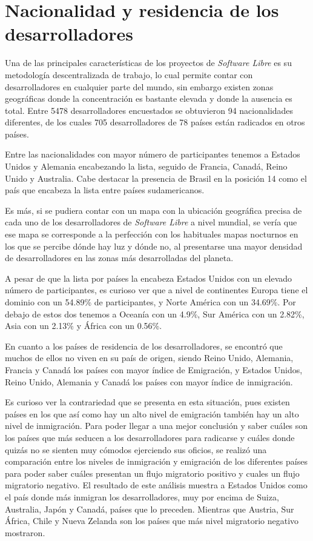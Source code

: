 \section{Nacionalidad y residencia de los desarrolladores}

Una de las principales características de los proyectos de \textit{Software Libre} es su metodología descentralizada de trabajo, lo cual permite contar con desarrolladores en cualquier parte del mundo, sin embargo existen zonas geográficas donde la concentración es bastante elevada y donde la ausencia es total. Entre 5478 desarrolladores encuestados se obtuvieron 94 nacionalidades diferentes, de los cuales 705 desarrolladores de 78 países están radicados en otros países. 

Entre las nacionalidades con mayor número de participantes tenemos a Estados Unidos y Alemania encabezando la lista, seguido de Francia, Canadá, Reino Unido y Australia. Cabe destacar la presencia de Brasil en la posición 14 como el país que encabeza la lista entre países sudamericanos.

Es más, si se pudiera contar con un mapa con la ubicación geográfica precisa de cada uno de los desarrolladores de \textit{Software Libre} a nivel mundial, se vería que ese mapa se corresponde a la perfección con los habituales mapas nocturnos en los que se percibe dónde hay luz y dónde no, al presentarse una mayor densidad de desarrolladores en las zonas más desarrolladas del planeta.

A pesar de que la lista por países la encabeza Estados Unidos con un elevado número de participantes, es curioso ver que a nivel de continentes Europa tiene el dominio con un 54.89\% de participantes, y Norte América con un 34.69\%. Por debajo de estos dos tenemos a Oceanía con un 4.9\%, Sur América con un 2.82\%, Asia con un 2.13\% y África con un 0.56\%.

En cuanto a los países de residencia de los desarrolladores, se encontró que muchos de ellos no viven en su país de origen, siendo Reino Unido, Alemania, Francia y Canadá los países con mayor índice de Emigración, y Estados Unidos, Reino Unido, Alemania y Canadá los países con mayor índice de inmigración. 

Es curioso ver la contrariedad que se presenta en esta situación, pues existen países en los que así como hay un alto nivel de emigración también hay un alto nivel de inmigración. Para poder llegar a una mejor conclusión y saber cuáles son los países que más seducen a los desarrolladores para radicarse y cuáles donde quizás no se sienten muy cómodos ejerciendo sus oficios, se realizó una comparación entre los niveles de inmigración y emigración de los diferentes países para poder saber cuáles presentan un flujo migratorio positivo  y cuales un flujo migratorio negativo. El resultado de este análisis muestra a Estados Unidos como el país donde más inmigran los desarrolladores, muy por encima de Suiza, Australia, Japón y Canadá, países que lo preceden. Mientras que Austria, Sur África, Chile y Nueva Zelanda son los países que más nivel migratorio negativo mostraron.

